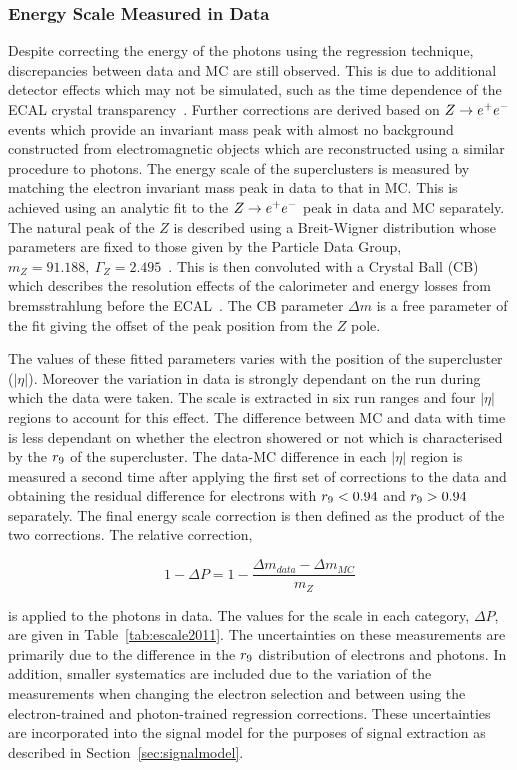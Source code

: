 \subsubsection{Energy Scale Measured in Data}
Despite correcting the energy of the photons using the regression technique, discrepancies between data and
MC are still observed. This is due to additional detector effects which may not be simulated, such as the
time dependence of the ECAL crystal transparency~\cite{null}. Further corrections are
derived based on $Z\rightarrow e^{+}e^{-}$ events which provide an invariant mass peak with almost no background constructed from 
electromagnetic objects which are reconstructed using a similar procedure to photons.
The energy scale of the superclusters is measured by matching the electron
invariant mass peak in data to that in MC. This is achieved using an analytic fit to the $Z\rightarrow e^{+}e^{-}$ peak in data and MC
separately. The natural peak of the $Z$ is described using a Breit-Wigner distribution whose parameters are fixed
to those given by the Particle Data Group, $m_{Z}=91.188,~\Gamma_{Z} = 2.495$~\cite{pdg}. This is then convoluted 
with a Crystal Ball (CB) which describes the resolution effects of the calorimeter and energy losses from 
bremsstrahlung before the ECAL~\cite{crystalball}. 
The CB parameter $\Delta m$ is a free parameter of the fit giving the 
offset of the peak position from the $Z$ pole. 

The values of these fitted parameters varies with the position of the supercluster ($|\eta|$). Moreover the
variation in data is strongly dependant on the run during which the data were taken. The scale is extracted in 
six run ranges and four $|\eta|$ regions to account for this effect. 
The difference between MC and data with time is less dependant on whether the electron showered or not which 
is characterised by the $r_{9}$ of the supercluster. The data-MC difference in each $|\eta|$ region is measured
a second time after applying the first set of corrections to the data and obtaining the residual difference
for electrons with $r_{9}<0.94$ and $r_{9}>0.94$ separately. The final energy scale correction is then defined
as the product of the two corrections. The relative correction, 

\begin{equation}
1-\Delta P = 1 - \frac {\displaystyle \Delta m_{data} - \Delta m_{MC} }{\displaystyle m_{Z} }
\end{equation}

is applied to the photons in data. The values for the scale in each category, $\Delta P$, are given in 
Table~\ref{tab:escale2011}. The uncertainties on these measurements are primarily due to 
the difference in the $r_{9}$ distribution of electrons and photons. In addition, smaller systematics
are included due to the variation of the measurements when changing the electron selection and
between using the electron-trained and photon-trained regression corrections.
These uncertainties are incorporated into the signal model for the purposes of 
signal extraction as described in Section~\ref{sec:signalmodel}.

